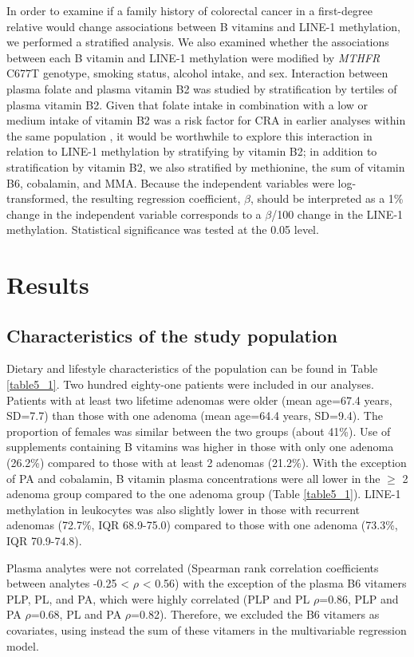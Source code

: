 \noindent In order to examine if a family history of colorectal cancer in a first-degree relative would change associations between B vitamins and LINE-1 methylation, we performed a stratified analysis. We also examined whether the associations between each B vitamin and LINE-1 methylation were modified by \emph{MTHFR} C677T genotype, smoking status, alcohol intake, and sex. Interaction between plasma folate and plasma vitamin B2 was studied by stratification by tertiles of plasma vitamin B2. Given that folate intake in combination with a low or medium intake of vitamin B2 was a risk factor for CRA in earlier analyses within the same population \cite{c525}, it would be worthwhile to explore this interaction in relation to LINE-1 methylation by stratifying by vitamin B2; in addition to stratification by vitamin B2, we also stratified by methionine, the sum of vitamin B6, cobalamin, and MMA. Because the independent variables were log-transformed, the resulting regression coefficient, $\beta$, should be interpreted as a 1\% change in the independent variable corresponds to a $\beta$/100 change in the LINE-1 methylation. Statistical significance was tested at the 0.05 level.

\section{Results} %
\subsection{Characteristics of the study population} %
\noindent Dietary and lifestyle characteristics of the population can be found in Table \ref{table5_1}. Two hundred eighty-one patients were included in our analyses. Patients with at least two lifetime adenomas were older (mean age=67.4 years, SD=7.7) than those with one adenoma (mean age=64.4 years, SD=9.4). The proportion of females was similar between the two groups (about 41\%). Use of supplements containing B vitamins was higher in those with only one adenoma (26.2\%) compared to those with at least 2 adenomas (21.2\%). With the exception of PA and cobalamin, B vitamin plasma concentrations were all lower in the $\geq$ 2 adenoma group compared to the one adenoma group (Table \ref{table5_1}). LINE-1 methylation in leukocytes was also slightly lower in those with recurrent adenomas (72.7\%, IQR 68.9-75.0) compared to those with one adenoma (73.3\%, IQR 70.9-74.8).

\noindent Plasma analytes were not correlated (Spearman rank correlation coefficients between analytes -0.25 < $\rho$ < 0.56) with the exception of the plasma B6 vitamers PLP, PL, and PA, which were highly correlated (PLP and PL $\rho$=0.86, PLP and PA $\rho$=0.68, PL and PA $\rho$=0.82). Therefore, we excluded the B6 vitamers as covariates, using instead the sum of these vitamers in the multivariable regression model.

